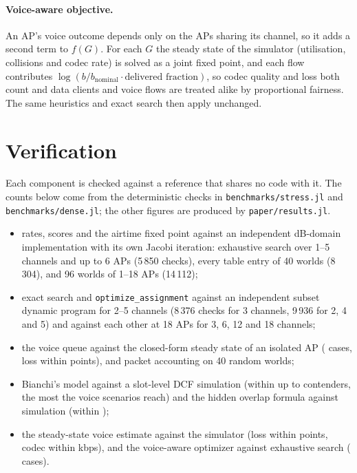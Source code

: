 \documentclass[10pt]{article}
\newcommand{\code}[1]{\texttt{#1}}
\begin{document}
\paragraph{Voice-aware objective.}
An AP's voice outcome depends only on the APs sharing its channel, so it adds a second term to $f(G)$. For each $G$ the
steady state of the simulator (utilisation, collisions and codec rate) is solved as a joint fixed point, and each flow
contributes $\log(b/b_{\text{nominal}} \cdot \text{delivered fraction})$, so codec quality and loss both count and data
clients and voice flows are treated alike by proportional fairness. The same heuristics and exact search then apply
unchanged.

\section{Verification}

Each component is checked against a reference that shares no code with it. The counts below come from the
deterministic checks in \code{benchmarks/stress.jl} and \code{benchmarks/dense.jl}; the other figures are produced
by \code{paper/results.jl}.
\begin{itemize}
\item rates, scores and the airtime fixed point against an independent dB-domain implementation with its own Jacobi
  iteration: exhaustive search over 1--5 channels and up to 6 APs (5\,850 checks), every table entry of 40 worlds
  (8\,304), and 96 worlds of 1--18 APs (14\,112);
\item exact search and \code{optimize\_assignment} against an independent subset dynamic program for 2--5 channels
  (8\,376 checks for 3 channels, 9\,936 for 2, 4 and 5) and against each other at 18 APs for 3, 6, 12 and 18 channels;
\item the voice queue against the closed-form steady state of an isolated AP (\isolatedCases{} cases, loss within
  \isolatedLossError{} points), and packet accounting on 40 random worlds;
\item Bianchi's model against a slot-level DCF simulation (within \bianchiErrorScenario{} up to \maxContenders{} contenders,
  the most the voice scenarios reach) and the hidden overlap formula against simulation (within \hiddenError{});
\item the steady-state voice estimate against the simulator (loss within \estimateLossError{} points, codec within
  \estimateCodecError{} kbps), and the voice-aware optimizer against exhaustive search (\voiceExactCases{} cases).
\end{itemize}
\end{document}
